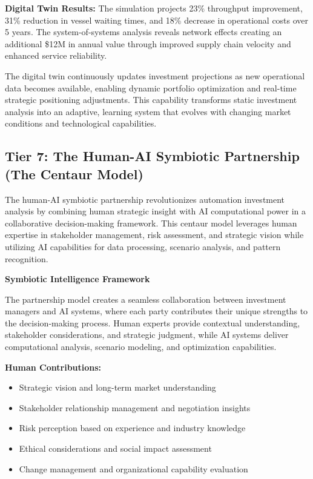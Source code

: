 \documentclass{article}
\begin{document}
\textbf{Digital Twin Results:}
The simulation projects 23\% throughput improvement, 31\% reduction in vessel waiting times, and 18\% decrease in operational costs over 5 years. The system-of-systems analysis reveals network effects creating an additional \$12M in annual value through improved supply chain velocity and enhanced service reliability.

The digital twin continuously updates investment projections as new operational data becomes available, enabling dynamic portfolio optimization and real-time strategic positioning adjustments. This capability transforms static investment analysis into an adaptive, learning system that evolves with changing market conditions and technological capabilities.

\subsection{Tier 7: The Human-AI Symbiotic Partnership (The Centaur Model)}

The human-AI symbiotic partnership revolutionizes automation investment analysis by combining human strategic insight with AI computational power in a collaborative decision-making framework. This centaur model leverages human expertise in stakeholder management, risk assessment, and strategic vision while utilizing AI capabilities for data processing, scenario analysis, and pattern recognition.

\textbf{Symbiotic Intelligence Framework}

The partnership model creates a seamless collaboration between investment managers and AI systems, where each party contributes their unique strengths to the decision-making process. Human experts provide contextual understanding, stakeholder considerations, and strategic judgment, while AI systems deliver computational analysis, scenario modeling, and optimization capabilities.

\textbf{Human Contributions:}
\begin{itemize}
\item Strategic vision and long-term market understanding
\item Stakeholder relationship management and negotiation insights
\item Risk perception based on experience and industry knowledge
\item Ethical considerations and social impact assessment
\item Change management and organizational capability evaluation
\end{itemize}
\end{document}
